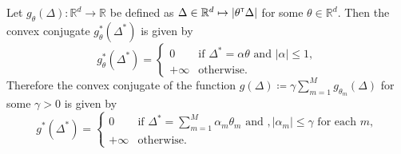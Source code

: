 \documentclass[12pt]{article}
\begin{document}
\begin{lemma}
\label{lem:2}
    Let $g_\theta(\Delta):\mathbb{R}^d\to \mathbb{R}$ be defined as $\Delta\in\mathbb{R}^d \mapsto |\theta^{\scriptscriptstyle \sf T} \Delta|$ for some $\theta\in \mathbb{R}^d$. Then the convex conjugate $g_\theta^*(\Delta^*)$ is given by \[
    g_\theta^*(\Delta^*) = \begin{cases}
     0 &\text{if } \Delta^* = \alpha \theta \text{ and } |\alpha| \leq 1,\\
     +\infty &\text{otherwise.}
    \end{cases}
    \]Therefore the convex conjugate of the function $g(\Delta) \coloneqq \gamma \sum_{m=1}^Mg_{\theta_m}(\Delta)$ for some $\gamma > 0$ is given by \[
    g^*(\Delta^*) = \begin{cases}
        0 &\text{if } \Delta^* = \sum_{m=1}^M \alpha_m \theta_m \text{ and }, |\alpha_m| \leq \gamma \text{ for each }m, \\
        +\infty & \text{otherwise.}
    \end{cases}
    \]
\end{lemma}
\end{document}
